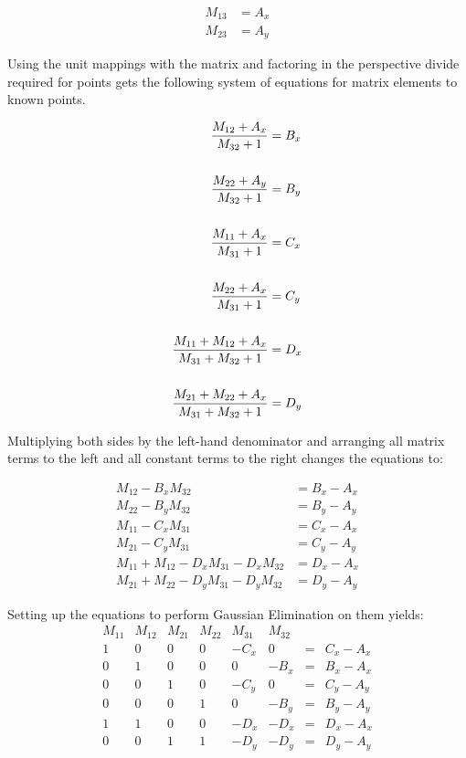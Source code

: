 \documentclass[letterpaper, 11pt]{article}
\begin{document}
\begin{enumerate}
\begin{align}    
M_{13} &= A_x \\
M_{23} &= A_y
\end{align}

Using the unit mappings with the matrix and factoring in the perspective divide 
required for points gets the following system of equations for 
matrix elements to known points.

\begin{align}
{M_{12} + A_x}\over{M_{32} + 1} &= B_x \\ \\
{M_{22} + A_y}\over{M_{32} + 1} &= B_y \\ \\
{M_{11} + A_x}\over{M_{31} + 1} &= C_x \\ \\
{M_{22} + A_x}\over{M_{31} + 1} &= C_y \\ \\
{M_{11} + M_{12} + A_x}\over{M_{31} + M_{32} + 1} &= D_x \\ \\
{M_{21} + M_{22} + A_x}\over{M_{31} + M_{32} + 1} &= D_y
\end{align}

Multiplying both sides by the left-hand denominator and arranging all matrix
terms to the left and all constant terms to the right changes the equations to:

\begin{align}
M_{12} - B_{x}M_{32} &= B_x - A_x \\
M_{22} - B_{y}M_{32} &= B_y - A_y \\
M_{11} - C_{x}M_{31} &= C_x - A_x \\
M_{21} - C_{y}M_{31} &= C_y - A_y \\
M_{11} + M_{12} - D_{x}M_{31} - D_{x}M_{32} &= D_x - A_x \\
M_{21} + M_{22} - D_{y}M_{31} - D_{y}M_{32} &= D_y - A_y
\end{align}

Setting up the equations to perform Gaussian Elimination on them yields:
\[
\begin{array}{cccccccc}
M_{11} & M_{12} & M_{21} & M_{22} & M_{31} & M_{32} \\
1 & 0 & 0 & 0 & -C_x & 0 & = & C_x - A_x \\
0 & 1 & 0 & 0 & 0 & -B_x & = & B_x - A_x \\
0 & 0 & 1 & 0 & -C_y & 0 & = & C_y - A_y \\
0 & 0 & 0 & 1 & 0 & -B_y & = & B_y - A_y \\
1 & 1 & 0 & 0 & -D_x & -D_x & = & D_x - A_x \\
0 & 0 & 1 & 1 & -D_y & -D_y & = & D_y - A_y
\end{array}
\]


\end{enumerate}
\end{document}
